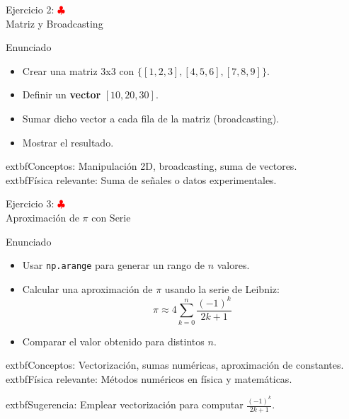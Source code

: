 \documentclass[10pt]{beamer}
\begin{document}
\begin{frame}{Ejercicio 2: \hfill \textcolor{red}{$\clubsuit$} \\ Matriz y Broadcasting}
  \begin{block}{Enunciado}
    \begin{itemize}
      \item Crear una matriz 3x3 con $\{[1,2,3],[4,5,6],[7,8,9]\}$.
      \item Definir un \textbf{vector} $[10, 20, 30]$.
      \item Sumar dicho vector a cada fila de la matriz (broadcasting).
      \item Mostrar el resultado.
    \end{itemize}
  \end{block}
  	extbf{Conceptos:} Manipulación 2D, broadcasting, suma de vectores.\\
  	extbf{Física relevante:} Suma de señales o datos experimentales.
\end{frame}

\begin{frame}{Ejercicio 3: \hfill \textcolor{red}{$\clubsuit$} \\ Aproximación de $\pi$ con Serie}
  \begin{block}{Enunciado}
    \begin{itemize}
      \item Usar \texttt{np.arange} para generar un rango de $n$ valores.
      \item Calcular una aproximación de $\pi$ usando la serie de Leibniz:
      \[
        \pi \approx 4 \sum_{k=0}^{n} \frac{(-1)^k}{2k+1}
      \]
      \item Comparar el valor obtenido para distintos $n$.
    \end{itemize}
  \end{block}
  	extbf{Conceptos:} Vectorización, sumas numéricas, aproximación de constantes.\\
  	extbf{Física relevante:} Métodos numéricos en física y matemáticas.
  
  	extbf{Sugerencia}: Emplear vectorización para computar $\frac{(-1)^k}{2k+1}$.
\end{frame}
\end{document}
